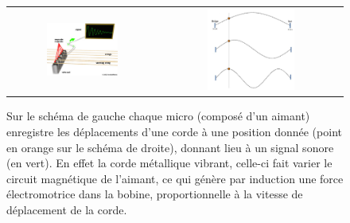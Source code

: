 \documentclass[a4,12pt]{article}
\begin{document}
\begin{figure}
	\begin{center}
		\begin{tabular}{cc}
			\includegraphics[width=0.5\textwidth]{images/micros_schema.pdf} &
			\includegraphics[width=0.5\textwidth]{images/micros_positions.pdf}
		\end{tabular}
		\caption{Sur le schéma de gauche chaque micro (composé d'un aimant) enregistre les déplacements 		d'une corde à une position donnée (point en orange sur le schéma de droite), donnant lieu à un signal 		sonore (en vert). En effet la corde métallique vibrant, celle-ci fait varier le circuit magnétique de l'aimant, 		ce qui génère par induction une force électromotrice dans la bobine, proportionnelle à la vitesse de 			déplacement de la corde.}
		\label{fig:micros2}
	\end{center}
\end{figure}
\end{document}
